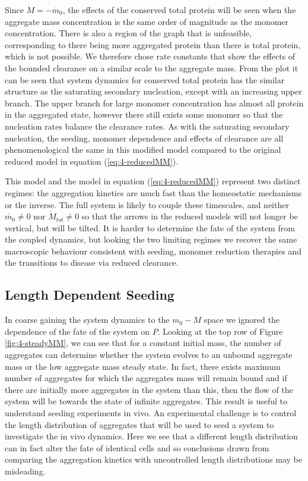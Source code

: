 Since $\dot{M}=-\dot{m_0}$, the effects of the conserved total protein will be seen when the aggregate mass concentration is the same order of magnitude as the monomer concentration.  There is also a region of the graph that is unfeasible, corresponding to there being more aggregated protein than there is total protein, which is not possible.  We therefore chose rate constants that show the effects of the bounded clearance on a similar scale to the aggregate mass. From the plot it can be seen that system dynamics for conserved total protein has the similar structure as the saturating secondary nucleation, except with an increasing upper branch. The upper branch for large monomer concentration has almost all protein in the aggregated state, however there still exists some monomer so that the nucleation rates balance the clearance rates. As with the saturating secondary nucleation, the seeding, monomer dependence and effects of clearance are all phenomenological the same in this modified model compared to the original reduced model in equation (\ref{eq:4-reducedMM}).

This model and the model in equation (\ref{eq:4-reducedMM}) represent two distinct regimes: the aggregation kinetics are much fast than the homeostatic mechanisms or the inverse. The full system is likely to couple these timescales, and neither $\dot{m_0} \neq 0$ nor $\dot{M}_{tot} \neq 0$ so that the arrows in the reduced models will not longer be vertical, but will be tilted. It is harder to determine the fate of the system from the coupled dynamics, but looking the two limiting regimes we recover the same macroscopic behaviour consistent with seeding, monomer reduction therapies and the transitions to disease via reduced clearance.

\subsection{Length Dependent Seeding}

In coarse gaining the system dynamics to the $m_0-M$ space we ignored the dependence of the fate of the system on $P$. Looking at the top row of Figure \ref{fig:4-steadyMM}, we can see that for a constant initial mass, the number of aggregates can determine whether the system evolves to an unbound aggregate mass or the low aggregate mass steady state. In fact, there exists maximum number of aggregates for which the aggregates mass will remain bound and if there are initially more aggregates in the system than this, then the flow of the system will be towards the state of infinite aggregates. This result is useful to understand seeding experiments in vivo. An experimental challenge is to control the length distribution of aggregates that will be used to seed a system to investigate the in vivo dynamics. Here we see that a different length distribution can in fact alter the fate of identical cells and so conclusions drawn from comparing the aggregation kinetics with uncontrolled length distributions may be misleading.

